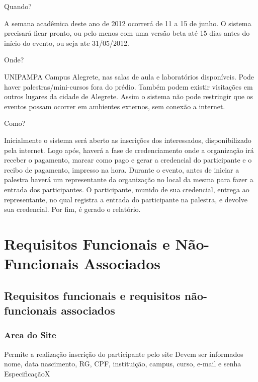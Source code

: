 \documentclass[12pt,a4paper]{article}
\begin{document}
\begin{onehalfspace}
        Quando?
        
        A semana acadêmica deste ano de 2012 ocorrerá de 11 a 15 de junho. O sistema precisará ficar pronto, ou pelo menos com uma versão beta até 15 dias antes do início do evento, ou seja ate 31/05/2012.
        
        Onde?
        
        UNIPAMPA Campus Alegrete, nas salas de aula e laboratórios disponíveis. Pode haver palestras/mini-cursos fora do prédio. Também podem existir visitações em outros lugares da cidade de Alegrete. Assim o sistema não pode restringir que os eventos possam ocorrer em ambientes externos, sem conexão a internet.
        
        Como?
        
        Inicialmente o sistema será aberto as inscrições dos interessados, disponibilizado pela internet. Logo após, haverá a fase de credenciamento onde a organização irá receber o pagamento, marcar como pago e gerar a credencial do participante e o recibo de pagamento, impresso na hora. Durante o evento, antes de iniciar a palestra haverá um representante da organização no local da mesma para fazer a entrada dos participantes. O participante, munido de sua credencial, entrega ao representante, no qual registra a entrada do participante na palestra, e devolve sua credencial. Por fim, é gerado o relatório.
        \end{onehalfspace}

        \clearpage
        \section{Requisitos Funcionais e Não-Funcionais Associados}
        
        	\subsection{Requisitos funcionais e requisitos não-funcionais associados}
			\setcounter{NumberReqF}{0}
			\setcounter{NumberReqNF}{0}
			\subsubsection{Area do Site}
        	
				{Permite a realização inscrição do participante pelo site}
				{%
					  {Devem ser informados nome, data nascimento, RG, CPF, instituição, campus, curso, e-mail e senha}
					  {Especificação}{}{X}%
				}
				
\end{document}
